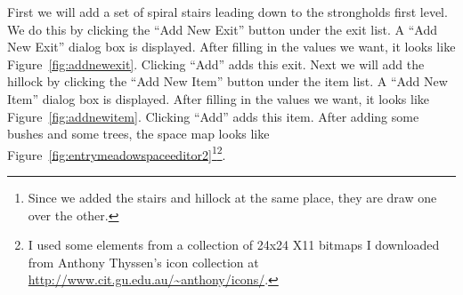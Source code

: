 First we will add a set of spiral stairs leading down to the
strongholds first level.  We do this by clicking the ``Add New Exit''
button under the exit list.  A ``Add New Exit'' dialog box is
displayed.  After filling in the values we want, it looks like
Figure~\ref{fig:addnewexit}. Clicking ``Add'' adds this exit.  Next we
will add the hillock by clicking the ``Add New Item'' button under the
item list.  A ``Add New Item'' dialog box is displayed.  After filling
in the values we want, it looks like Figure~\ref{fig:addnewitem}. 
Clicking ``Add'' adds this item.  After adding some bushes and some
trees, the space map looks like
Figure~\ref{fig:entrymeadowspaceeditor2}\footnote{Since we added the
stairs and hillock at the same place, they are draw one over the
other.}\footnote{I used some elements from a collection of 24x24 X11
bitmaps I downloaded from Anthony Thyssen's icon collection at
\url{http://www.cit.gu.edu.au/~anthony/icons/}.}.



